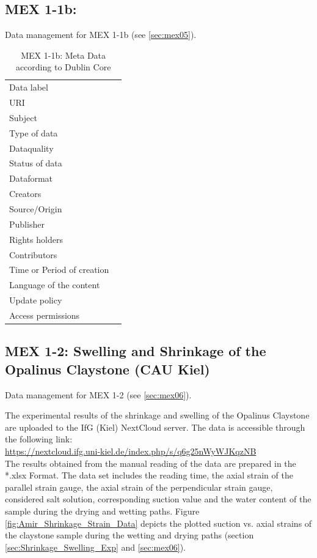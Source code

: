 \subsection{MEX 1-1b:}

Data management for MEX 1-1b (see \ref{sec:mex05}).

\begin{table}[h!]
\caption{MEX 1-1b: Meta Data according to Dublin Core}
\label{tab:}
\small
\begin{tabular}{R{3cm}|L{7cm}}
\hline
%
Data label &  \\
URI &  \\
Subject  &  \\
Type of data  &  \\
Dataquality  &  \\
Status of data  &  \\
Dataformat  & \\
Creators  &  \\
Source/Origin &  \\
Publisher  &  \\
Rights holders &  \\
Contributors &  \\
Time or Period of creation &  \\
Language of the content &  \\
Update policy &  \\
Access permissions &  \\
%
\hline
\end{tabular}
\end{table}

\subsection{MEX 1-2: Swelling and Shrinkage of the Opalinus Claystone (CAU Kiel)}

Data management for MEX 1-2 (see \ref{sec:mex06}).

The experimental results of the shrinkage and swelling of the Opalinus Claystone are uploaded to the IfG (Kiel) NextCloud server. The data is accessible through the following link:\\
\hyperlink{https://nextcloud.ifg.uni-kiel.de/index.php/s/q6g25nWyWJKqzNB}{https://nextcloud.ifg.uni-kiel.de/index.php/s/q6g25nWyWJKqzNB}\\

The results obtained from the manual reading of the data are prepared in the *.xlsx Format. The data set includes the reading time, the axial strain of the parallel strain gauge, the axial strain of the perpendicular strain gauge, considered salt solution, corresponding suction value and the water content of the sample during the drying and wetting paths. Figure \ref{fig:Amir_Shrinkage_Strain_Data} depicts the plotted suction vs. axial strains of the claystone sample during the wetting and drying paths (section \ref{sec:Shrinkage_Swelling_Exp} and \ref{sec:mex06}).

